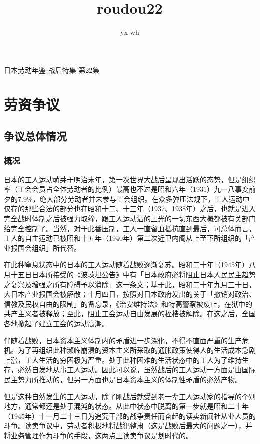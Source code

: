 \documentclass[a4paper,12pt]{article}
\author{yx-wh}
\title{roudou22}
\begin{document}
\newpage
日本劳动年鉴 战后特集 第22集
\setcounter{tocdepth}{3}
\tableofcontents
\newpage

\section{劳资争议}

\subsection{争议总体情况}

\subsubsection{概况}

日本的工人运动萌芽于明治末年，第一次世界大战后呈现出活跃的态势，但是组织率（工会会员占全体劳动者的比例）最高也不过是昭和六年（1931）九一八事变前夕的7.9\%，绝大部分劳动者并未参与工会组织。在众多弹压法规下，工人运动中仅存的那些合法的部分也在昭和十二、十三年（1937、1938年）之后，也就是进入完全战时体制之后被强力取缔，跟工人运动沾的上光的一切东西大概都被有关部门给完全控制了。当然，对于此番压制，工人一直留血抵抗直到最后，可总体而言，工人的自主运动已被昭和十五年（1940年）第二次近卫内阁从上至下所组织的「产业报国会组织」所代替。

在此种窒息状态中的日本的工人运动随着战败逐渐复苏。昭和二十年（1945年）八月十五日日本所接受的《波茨坦公告》中有「日本政府必将阻止日本人民民主趋势之复兴及增强之所有障碍予以消除」这一条文；基于此，昭和二十年九月三十日，大日本产业报国会被解散；十月四日，按照对日本政府发出的关于「撤销对政治、信教及民权自由的限制」的备忘录，《治安维持法》和特高警察被废止，在狱中的共产主义者被释放；至此，阻止工会运动自由发展的桎梏被解除。在这之后，全国各地掀起了建立工会的运动高潮。

伴随着战败，日本资本主义体制内的矛盾进一步深化，不得不直面严重的生产危机。为了再组织此种濒临崩溃的资本主义所采取的通胀政策使得人的生活成本急剧上涨，工人生活的穷困极为严重。处于此种困难的生活状态中的工人为了维持生存，必然自发地从事工人运动。因此可以说，虽然战后的工人运动一方面是由国际民主势力所推动的，但另一方面也是日本资本主义的体制性矛盾的必然产物。

但是这种自然发生的工人运动，除了刚战后就受到老一辈工人运动家的指导的个别地方，通常都还是处于混沌的状态。从此中状态中脱离的第一步就是昭和二十年（1945年）十一月二十三日为追究干部的战争责任而奋起的读卖新闻社从业人员的斗争。读卖争议中，劳动者积极地将战犯整肃（这是战败后最大的问题之一），并将业务管理作为斗争的手段，这两点上读卖争议是划时代的。
\end{document}
